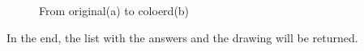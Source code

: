 \begin{figure}[H]
    \centering
    \qquad
    \caption{From original(a) to coloerd(b)}
\end{figure}

In the end, the list with the answers and the drawing will be returned.


